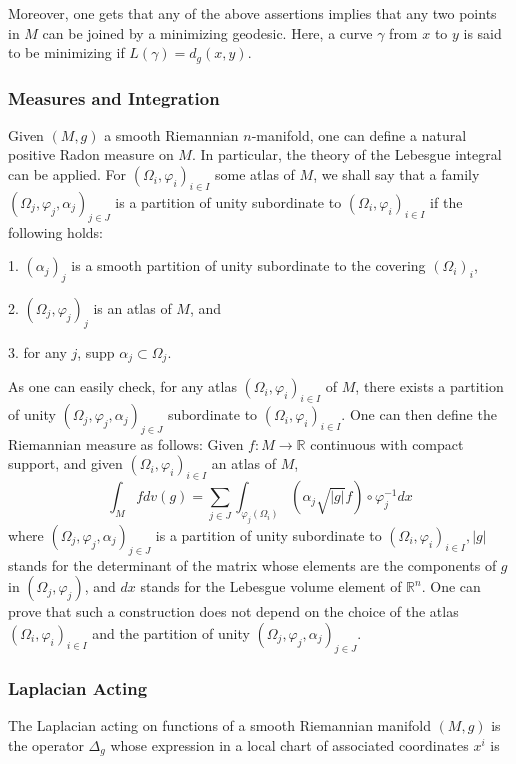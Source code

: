 \documentclass[12pt,hyperref,a4paper,UTF8]{ctexart}
\begin{document}
\noindent
Moreover, one gets that any of the above assertions implies that any two points in $M$ can be joined by a minimizing geodesic. Here, a curve $\gamma$ from $x$ to $y$ is said to be minimizing if $L(\gamma)=d_g(x, y)$.

\subsubsection{Measures and Integration}
Given $(M, g)$ a smooth Riemannian $n$-manifold, one can define a natural positive Radon measure on $M$. In particular, the theory of the Lebesgue integral can be applied. For $\left(\Omega_i, \varphi_i\right)_{i \in I}$ some atlas of $M$, we shall say that a family $\left(\Omega_j, \varphi_j, \alpha_j\right)_{j \in J}$ is a partition of unity subordinate to $\left(\Omega_i, \varphi_i\right)_{i \in I}$ if the following holds:

1. $\left(\alpha_j\right)_j$ is a smooth partition of unity subordinate to the covering $\left(\Omega_i\right)_i$,

2. $\left(\Omega_j, \varphi_j\right)_j$ is an atlas of $M$, and

3. for any $j$, supp $\alpha_j \subset \Omega_j$.

\vskip 3pt
\noindent
As one can easily check, for any atlas $\left(\Omega_i, \varphi_i\right)_{i \in I}$ of $M$, there exists a partition of unity $\left(\Omega_j, \varphi_j, \alpha_j\right)_{j \in J}$ subordinate to $\left(\Omega_i, \varphi_i\right)_{i \in I}$. One can then define the Riemannian measure as follows: Given $f: M \rightarrow \mathbb{R}$ continuous with compact support, and given $\left(\Omega_i, \varphi_i\right)_{i \in I}$ an atlas of $M$,
$$
\int_M f d v(g)=\sum_{j \in J} \int_{\varphi_j\left(\Omega_i\right)}\left(\alpha_j \sqrt{|g|} f\right) \circ \varphi_j^{-1} d x
$$
where $\left(\Omega_j, \varphi_j, \alpha_j\right)_{j \in J}$ is a partition of unity subordinate to $\left(\Omega_i, \varphi_i\right)_{i \in I},|g|$ stands for the determinant of the matrix whose elements are the components of $g$ in $\left(\Omega_j, \varphi_j\right)$, and $d x$ stands for the Lebesgue volume element of $\mathbb{R}^n$. One can prove that such a construction does not depend on the choice of the atlas $\left(\Omega_i, \varphi_i\right)_{i \in I}$ and the partition of unity $\left(\Omega_j, \varphi_j, \alpha_j\right)_{j \in J}$.

\subsubsection{Laplacian Acting}
The Laplacian acting on functions of a smooth Riemannian manifold $(M, g)$ is the operator $\Delta_g$ whose expression in a local chart of associated coordinates $x^i$ is
\end{document}

